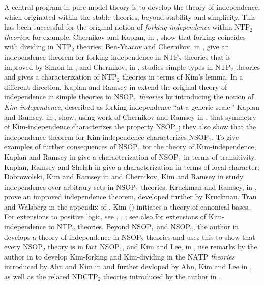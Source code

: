 \documentclass[12pt]{amsart}
\theoremstyle{definition}
\begin{document}
A central program in pure model theory is to develop the theory of independence, which originated within the stable theories, beyond stability and simplicity. This has been successful for the original notion of \textit{forking-independence} within \textit{$\mathrm{NTP}_2$ theories}: for example, Chernikov and Kaplan, in \cite{CK09}, show that forking coincides with dividing in $\mathrm{NTP}_2$ theories; Ben-Yaacov and Chernikov, in \cite{BYC07}, give an independence theorem for forking-independence in $\mathrm{NTP}_2$ theories that is improved by Simon in \cite{Sim20}, and Chernikov, in \cite{Che14}, studies simple types in $\mathrm{NTP}_2$ theories and gives a characterization of $\mathrm{NTP}_2$ theories in terms of Kim’s lemma. In a different direction, Kaplan and Ramsey in \cite{KR17} extend the original theory of independence in simple theories to \textit{$\mathrm{NSOP}_1$ theories} by introducing the notion of \textit{Kim-independence}, described as forking-independence “at a generic scale.” Kaplan and Ramsey, in \cite{KR17}, show, using work of Chernikov and Ramsey in \cite{CR15}, that symmetry of Kim-independence characterizes the property $\mathrm{NSOP}_1$; they also show that the independence theorem for Kim-independence characterizes $\mathrm{NSOP}_1$. To give examples of further consequences of $\mathrm{NSOP}_1$ for the theory of Kim-independence, Kaplan and Ramsey in \cite{KR19} give a characterization of $\mathrm{NSOP}_1$ in terms of transitivity, Kaplan, Ramsey and Shelah in \cite{KRS19} give a characterization in terms of local character; Dobrowolski, Kim and Ramsey in \cite{DKR22} and Chernikov, Kim and Ramsey in \cite{CKR20} study independence over arbitrary sets in $\mathrm{NSOP}_{1}$ theories. Kruckman and Ramsey, in \cite{KR18}, prove an improved independence theorem, developed further by Kruckman, Tran and Walsberg in the appendix of \cite{KTW22}. Kim (\cite{K21}) initiates a theory of canonical bases. For extensions to positive logic, see \cite{KD22}, \cite{K22}, \cite{DGK23}; see also \cite{CK19} for extensions of Kim-independence to $\mathrm{NTP}_{2}$ theories. Beyond $\mathrm{NSOP}_{1}$ and $\mathrm{NSOP}_{2}$, the author in \cite{NSOP2} develops a theory of independence in $\mathrm{NSOP}_2$ theories and uses this to show that every $\mathrm{NSOP}_2$ theory is in fact $\mathrm{NSOP}_1$, and Kim and Lee, in \cite{KL22}, use remarks by the author in \cite{NSOP2} to develop Kim-forking and Kim-dividing in the \textit{$\mathrm{NATP}$ theories} introduced by Ahn and Kim in \cite{AK20} and further devloped by Ahn, Kim and Lee in \cite{AK21}, as well as the related $\mathrm{NDCTP}_2$ theories introduced by the author in \cite{NSOP2}.
\end{document}
